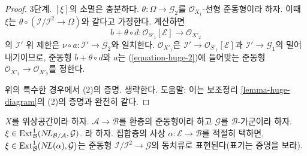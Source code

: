 \begin{proof}
\medskip\noindent
3단계. $[\xi]$의 소멸은 충분하다.
$\theta : \Omega \to \mathcal{G}_2$를 $\mathcal{O}_{X_1}$-선형
준동형이라 하자. 이때 $\xi$는
$\theta \circ (\mathcal{I}/\mathcal{I}^2 \to \Omega)$와 같다고
가정한다. 계산하면
$$
b + \theta \circ d : \mathcal{O}_{S'_1}[\mathcal{E}] \to \mathcal{O}_{X'_2}
$$
의 $\mathcal{I}'$ 위 제한은
$\nu \circ a : \mathcal{I}' \to \mathcal{G}_2$와 일치한다.
$\mathcal{O}_{X'_1}$은 $\mathcal{I}' \to
\mathcal{O}_{S'_1}[\mathcal{E}]$과 $\mathcal{I}' \to \mathcal{G}_1$의
밀어내기이므로, 준동형 $b + \theta \circ d$와 $a$는
(\ref{equation-huge-2})에 들어맞는 준동형
$\mathcal{O}_{X'_1} \to \mathcal{O}_{X'_2}$를 정한다.

\medskip\noindent
위의 특수한 경우에서 (2)의 증명. 생략한다. 도움말: 이는 보조정리
\ref{lemma-huge-diagram}의 (2)의 증명과 완전히 같다.
\end{proof}

\begin{lemma}
\label{lemma-NL-represent-ext-class}
$X$를 위상공간이라 하자. $\mathcal{A} \to \mathcal{B}$를 환층의
준동형이라 하고 $\mathcal{G}$를 $\mathcal{B}$-가군이라 하자.
$\xi \in \mathop{\mathrm{Ext}}\nolimits^1_\mathcal{B}(\mathop{N\!L}\nolimits_{\mathcal{B}/\mathcal{A}}, \mathcal{G})$. 
라 하자. 집합층의 사상 $\alpha : \mathcal{E} \to \mathcal{B}$를
적절히 택하면, $\xi \in \mathop{\mathrm{Ext}}\nolimits^1_\mathcal{B}(\mathop{N\!L}\nolimits(\alpha), \mathcal{G})$는
준동형 $\mathcal{I}/\mathcal{I}^2 \to \mathcal{G}$의 동치류로
표현된다(표기는 증명을 보라).
\end{lemma}

